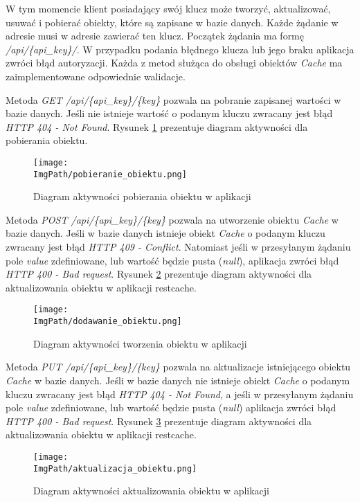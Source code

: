 W tym momencie klient posiadający swój klucz może tworzyć, aktualizować, usuwać i pobierać obiekty, które są zapisane w bazie danych. Każde żądanie w adresie musi w adresie zawierać ten klucz. Początek żądania ma formę \textsl{/api/\{api\_key\}/}. W przypadku podania błędnego klucza lub jego braku aplikacja zwróci błąd autoryzacji. Każda z metod służąca do obsługi obiektów \textsl{Cache} ma zaimplementowane odpowiednie walidacje. 

Metoda \textsl{GET /api/\{api\_key\}/\{key\}} pozwala na pobranie zapisanej wartości w bazie danych. Jeśli nie istnieje wartość o podanym kluczu zwracany jest błąd \textsl{HTTP 404 - Not Found}. Rysunek \ref{fig:pobieranie_obiektu} prezentuje diagram aktywności dla pobierania obiektu.
\begin{figure}[!ht]
\centering
\texttt{[image: \\ImgPath/pobieranie\_obiektu.png]}
\caption{Diagram aktywności pobierania obiektu w aplikacji}
\label{fig:pobieranie_obiektu}
\end{figure}

Metoda \textsl{POST /api/\{api\_key\}/\{key\}} pozwala na utworzenie obiektu \textsl{Cache} w bazie danych. Jeśli w bazie danych istnieje obiekt \textsl{Cache} o podanym kluczu zwracany jest błąd \textsl{HTTP 409 - Conflict}. Natomiast jeśli w przesyłanym żądaniu pole \textsl{value} zdefiniowane, lub wartość będzie pusta (\textsl{null}), aplikacja zwróci błąd \textsl{HTTP 400 - Bad request}.  Rysunek \ref{fig:tworzenie_obiektu} prezentuje diagram aktywności dla aktualizowania obiektu w aplikacji restcache.
\begin{figure}[!ht]
\centering
\texttt{[image: \\ImgPath/dodawanie\_obiektu.png]}
\caption{Diagram aktywności tworzenia obiektu w aplikacji}
\label{fig:tworzenie_obiektu}
\end{figure}

Metoda \textsl{PUT /api/\{api\_key\}/\{key\}} pozwala na aktualizacje istniejącego obiektu \textsl{Cache} w bazie danych. Jeśli w bazie danych  nie istnieje obiekt \textsl{Cache} o podanym kluczu zwracany jest błąd \textsl{HTTP 404 - Not Found}, a  jeśli w przesyłanym żądaniu pole \textsl{value} zdefiniowane, lub wartość będzie pusta (\textsl{null}) aplikacja zwróci błąd \textsl{HTTP 400 - Bad request}. Rysunek \ref{fig:aktualizowanie_obiektu} prezentuje diagram aktywności dla aktualizowania obiektu w aplikacji restcache.
\begin{figure}[!ht]
\centering
\texttt{[image: \\ImgPath/aktualizacja\_obiektu.png]}
\caption{Diagram aktywności aktualizowania obiektu w aplikacji}
\label{fig:aktualizowanie_obiektu}
\end{figure}

